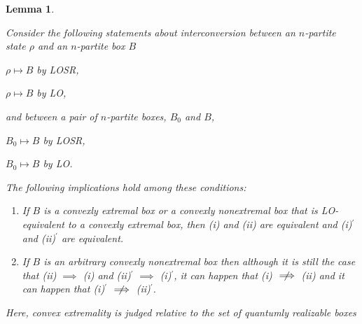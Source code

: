 \documentclass[prx,11pt,letterpaper,twocolumn,accepted=2023-11-27]{quantumarticle}
\theoremstyle{plain}
\newtheorem{lem}[theo]{Lemma}
\theoremstyle{definition}
\newcommand{\nimplies}{\centernot{\implies}}
\begin{document}
  
\begin{lem}
\begin{samepage}
    \label{convext}
    Consider the following statements about interconversion between an $n$-partite state $\rho$ and an $n$-partite box $B$
    \begin{compactenum}[(i)]
        \item  $\rho \mapsto B$ by LOSR,
        \item  $\rho \mapsto B$ by LO,
    \end{compactenum}
    and between a pair of $n$-partite boxes,  $B_0$ and $B$,
        \begin{compactenum}[(i)]
        \item[(i)$^{\prime}$]  $B_0 \mapsto B$ by LOSR,
        \item[(ii)$^{\prime}$]  $B_0 \mapsto B$ by LO.
    \end{compactenum}
The following implications hold among these conditions:
\end{samepage}
 \begin{enumerate}
 \item[(a)] If $B$ is a convexly extremal box or a convexly nonextremal box that is LO-equivalent to a convexly extremal box,
    then  (i) and (ii) are equivalent and (i)$^{\prime}$ and (ii)$^{\prime}$ are equivalent. 
\item[(b)] If $B$ is an arbitrary convexly nonextremal box 
 then although it is still the case that (ii) $\implies$ (i) and (ii)$^{\prime}$ $\implies$ (i)$^{\prime}$, it can happen that (i) $\nimplies$ (ii) and it can happen that (i)$^{\prime}$ $\nimplies$ (ii)$^{\prime}$.
 \end{enumerate} 
 Here, convex extremality is judged relative to the set of quantumly realizable boxes 
\end{lem}
\end{document}

